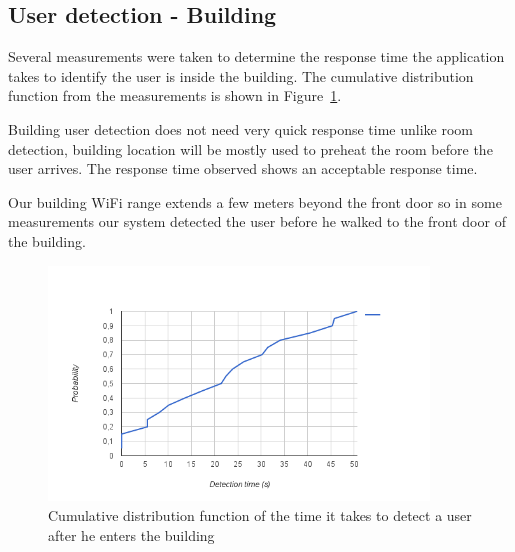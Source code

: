 \subsection{User detection - Building}

Several measurements were taken to determine the response time the application takes to identify the user is inside the building. The cumulative distribution function from the measurements is shown in Figure~\ref{eval:building1}.

Building user detection does not need very quick response time unlike room detection, building location will be mostly used to preheat the room before the user arrives. The response time observed shows an acceptable response time.



Our building \ac{WiFi} range extends a few meters beyond the front door so in some measurements our system detected the user before he walked to the front door of the building.

\begin{figure}[]
\centering
\includegraphics[width=0.9\textwidth]{Figures/building_detection_cumulative}
\caption{Cumulative distribution function of the time it takes to detect a user  after he enters the building}
\label{eval:building1}
\end{figure}





